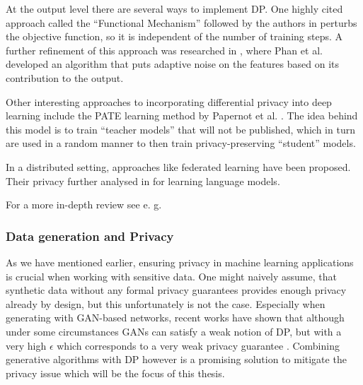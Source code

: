At the output level there are several ways to implement DP. One highly cited approach called the ``Functional Mechanism'' followed by the authors in \parencite{zhang2012functional} perturbs the objective function, so it is independent of the number of training steps. A further refinement of this approach was researched in \parencite{adlm2017}, where Phan et al. developed an algorithm that puts adaptive noise on the features based on its contribution to the output.

Other interesting approaches to incorporating differential privacy into deep learning include the PATE learning method by Papernot et al. \parencite{papernot2017semisupervised}. The idea behind this model is to train ``teacher models'' that will not be published, which in turn are used in a random manner to then train privacy-preserving ``student'' models. 

In a distributed setting, approaches like federated learning \parencite{konečný2015federated,Mo2019EfficientAP} have been proposed. Their privacy further analysed in \parencite{mcmahan2018learning} for learning language models.

\vspace*{1em}
For a more in-depth review see e. g. \parencite{surrve_ppml,surv_ppml_2,wang2023differential}


\subsubsection*{Data generation and Privacy}

As we have mentioned earlier, ensuring privacy in machine learning applications is crucial when working with sensitive data. One might naively assume, that synthetic data without any formal privacy guarantees provides enough privacy already by design, but this unfortunately is not the case. Especially when generating with GAN-based networks, recent works have shown that although under some circumstances GANs can satisfy a weak notion of DP, but with a very high $\epsilon$ which corresponds to a very weak privacy guarantee \parencite{lin2021privacy,stadler2022synthetic,jordon2022synthetic}. Combining generative algorithms with DP however is a promising solution to mitigate the privacy issue \parencite{bellovin2019privacy} which will be the focus of this thesis.

